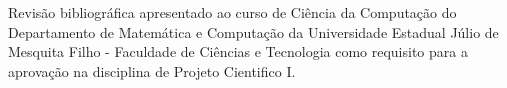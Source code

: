 \thispagestyle{empty}

\begin{center}
    \titulo
\end{center}

\vspace{6cm}

\begin{natureza}
    Revisão bibliográfica apresentado ao curso de Ciência da Computação do Departamento de Matemática e Computação da Universidade Estadual Júlio de Mesquita Filho - Faculdade de Ciências e Tecnologia como requisito para a aprovação na disciplina de Projeto Cientifico I.
\end{natureza}

\vspace*{\fill}

\begin{center}
    \uppercase{\cidade\\\the\year{}}
\end{center}